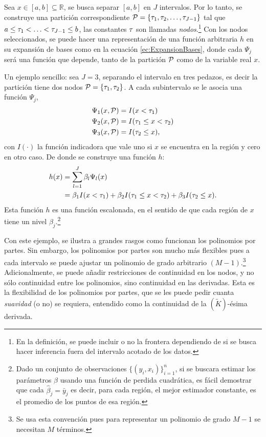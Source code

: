 \documentclass[../Main/Main.tex]{subfiles}
\begin{document}
Sea $x\in[a,b]\subseteq\mathbb{R}$, se busca separar $[a,b]$ en $J$ intervalos. Por lo tanto, se construye una partición correspondiente $\P = \left\{\t_1,  \t_2,\ldots,  \t_{J-1} \right\}$ tal que $a \leq  \t_1 < \ldots <  \t_{J-1} \leq b$, las constantes $\t$ son llamadas \textit{nodos}.\footnote{En la definición, se puede incluir o no la frontera dependiendo de si se busca hacer inferencia fuera del intervalo acotado de los datos.} Con los nodos seleccionados, se puede hacer una representación de una función arbitraria $h$ en su expansión de bases como en la ecuación \eqref{ec:ExpansionBases}, donde cada $\Psi_j$ será una función que depende, tanto de la partición $\P$ como de la variable real $x$. 

Un ejemplo sencillo: sea $J = 3$, separando el intervalo en tres pedazos, es decir la partición tiene dos nodos $\P = \left\{\t_1,  \t_2\right\}$. A cada subintervalo se le asocia una función $\Psi_j$,
\begin{align*}
	\Psi_1(x,\P) &= I( x <  \t_1) \\
	\Psi_2(x,\P) &= I( \t_1 \leq x <  \t_2) \\
	\Psi_3(x,\P) &= I( \t_2 \leq x ),
\end{align*}
con $I(\cdot)$ la función indicadora que vale uno si $x$ se encuentra en la región y cero en otro caso. De donde se construye una función $h$: 
\begin{align*}
		h(x) &= \sum_{l = 1}^J \beta_l\Psi_l(x) \\
			 &= \beta_1 I( x <  \t_1) + \beta_2 I( \t_1 \leq x <  \t_2) + \beta_3 I( \t_2 \leq x).
\end{align*}
Esta función $h$ es una función escalonada, en el sentido de que cada región de $x$ tiene un nivel $\beta_j$.\footnote{Dado un conjunto de observaciones $\{(y_i,x_i)\}_{i = 1}^n$, si se buscara estimar los parámetros $\beta$ usando una función de perdida cuadrática, es fácil demostrar que cada $\hat{\beta}_j = \bar{y}_j$ es decir, para cada región, el mejor estimador constante, es el promedio de los puntos de esa región.}

Con este ejemplo, se ilustra a grandes rasgos como funcionan los polinomios por partes. Sin embargo, los polinomios por partes son mucho más flexibles pues a cada intervalo se puede ajustar un polinomio de grado arbitrario $(M-1)$.\footnote{Se usa esta convención pues para representar un polinomio de grado $M-1$ se necesitan $M$ términos.} Adicionalmente, se puede añadir restricciones de continuidad en los nodos, y no sólo continuidad entre los polinomios, sino continuidad en las derivadas. Esta es la flexibilidad de los polinomios por partes, que se les puede pedir cuanta \textit{suavidad} (o no) se requiera, entendido como la continuidad de la $(\tilde{K})$-ésima derivada. 
\end{document}
